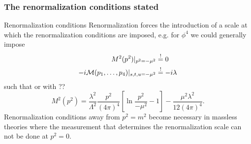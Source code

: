 \subsubsection{The renormalization conditions stated}
\begin{mybox}{Renormalization conditions}
Renormalization forces the introduction of a scale at which the renormalization conditions are imposed, e.g. for $\phi^4$ we could generally impose
\begin{align}
	M^2(p^2)|_{p^2=-\mu^2} &\stackrel{!}{=} 0 \\
	-i \mathcal{M}(p_1,\dots,p_4) |_{s,t,u=-\mu^2} &\stackrel{!}{=} -i \lambda 
\end{align}
such that or with ??
\begin{equation}
	M^2(p^2) = \frac{\lambda^2}{\Lambda^2} \frac{p^2}{(4\pi)^4} \left[\ln \frac{p^2}{-\mu^2} -1\right] - \frac{\mu^2 \lambda^2}{12 (4\pi)^4}.
\end{equation}
Renormalization conditions away from $p^2=m^2$ become necessary in massless theories where the measurement that determines the renormalization scale can not be done at $p^2=0$.
\end{mybox}
